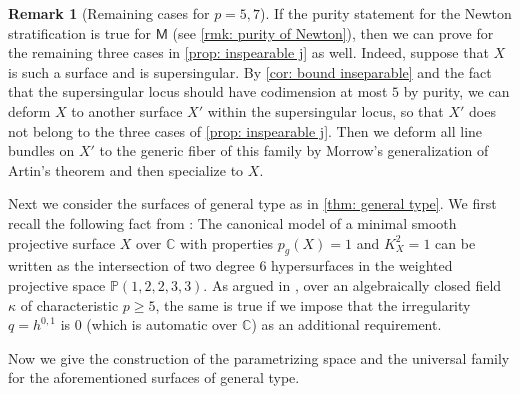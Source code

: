 \documentclass[11pt, letterpaper]{amsart}
\theoremstyle{plain}
\theoremstyle{definition}
\newtheorem{remark}[theorem]{Remark}
\newcommand{\IC}{\mathbb{C}}
\newcommand{\IP}{\mathbb{P}}
\newcommand{\<}{\langle}
\renewcommand{\>}{\rangle}
\newcommand{\sfM}{\mathsf{M}}
\begin{document}
\begin{remark}[Remaining cases for $p=5,7$]
\label{rmk: purity and supersingular}
    If the purity statement for the Newton stratification is true for $\sfM$ (see \cref{rmk: purity of Newton}), then we can prove  for the remaining three cases in \cref{prop: inspearable j} as well. 
    Indeed, suppose that $X$ is such a surface and is supersingular. By \cref{cor: bound inseparable} and the fact that the supersingular locus should have codimension at most $5$ by purity, we can deform $X$ to another surface $X'$ within the supersingular locus, so that $X'$ does not belong to the three cases of \cref{prop: inspearable j}. Then we deform all line bundles on $X'$ to the generic fiber of this family by Morrow's generalization of Artin's theorem \cite[Thm.~3.11]{Morrow} and then specialize to $X$. 
\end{remark}



Next we consider the surfaces of general type as in \cref{thm: general type}.
We first recall the following fact from \cite{Catanese, Todorov}: The canonical model of a minimal smooth projective surface $X$ over $\IC$ with properties $p_g(X) = 1$ and $K_X^2 = 1$ 
can be written as the intersection of two degree $6$ hypersurfaces in the weighted projective space $\IP(1, 2, 2, 3, 3)$. 
As argued in \cite[Thm.~8.0.1]{HYZ}, over an algebraically closed field $\kappa$ of characteristic $p \ge 5$, the same is true if we impose that the irregularity $q = h^{0, 1}$ is $0$ (which is automatic over $\IC$) as an additional requirement. 


Now we give the construction of the parametrizing space and the universal family for the aforementioned surfaces of general type.
\end{document}

